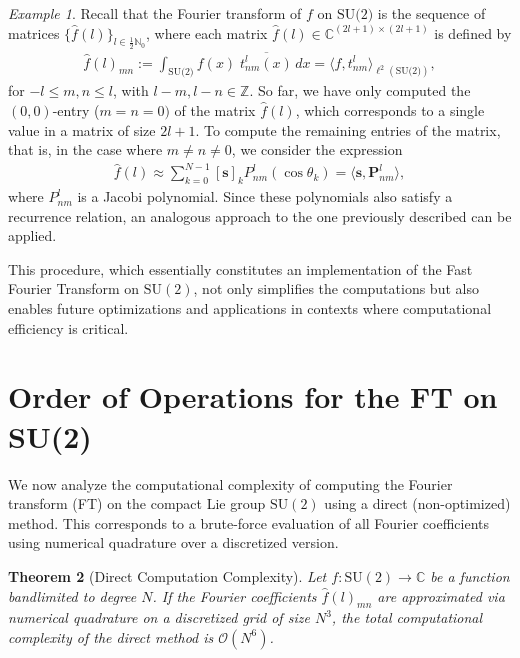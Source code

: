 \documentclass[11pt]{article}
\newtheorem{thm}{Theorem}[section]
\theoremstyle{definition}
\theoremstyle{remark}
\newtheorem{ex}[thm]{Example}
\numberwithin{equation}{section}
\begin{document}
\begin{ex}
Recall that the Fourier transform of $f$ on $\text{SU(2)}$ is the sequence of matrices $\{ \hat{f}(l) \}_{l \in \frac{1}{2} \mathbb{N}_0}$, where each matrix $\hat{f}(l) \in \mathbb{C}^{(2l+1) \times (2l+1)}$ is defined by
\begin{align*}
    \hat{f}(l)_{mn} := \int_{\text{SU(2)}} f(x) \; \overline{t^l_{nm}(x)} \, dx = \langle f, t^l_{nm} \rangle_{\ell^2(\text{SU(2)})},
\end{align*}
for $-l \leq m, n \leq l$, with $l - m, l - n \in \mathbb{Z}$.
So far, we have only computed the $(0, 0)$-entry ($m=n=0)$ of the matrix $\hat{f}(l)$, which corresponds to a single value in a matrix of size $2l+1$. To compute the remaining entries of the matrix, that is, in the case where $m \ne n \ne 0$, we consider the expression
\begin{align*}
    \hat{f}(l) \approx \sum_{k=0}^{N - 1} [\mathbf{s}]_k P^l_{nm}(\cos\theta_k) = \langle \mathbf{s}, \mathbf{P}^l_{nm} \rangle,
\end{align*}
where $P^l_{nm}$ is a Jacobi polynomial. Since these polynomials also satisfy a recurrence relation, an analogous approach to the one previously described can be applied.
\end{ex}
This procedure, which essentially constitutes an implementation of the Fast Fourier Transform on $\text{SU}(2)$, not only simplifies the computations but also enables future optimizations and applications in contexts where computational efficiency is critical.

\section{Order of Operations for the FT on SU(2)}\label{sec:order-FT}

We now analyze the computational complexity of computing the Fourier transform (FT) on the compact Lie group $\mathrm{SU}(2)$ using a direct (non-optimized) method. This corresponds to a brute-force evaluation of all Fourier coefficients using numerical quadrature over a discretized version.


\begin{thm}[Direct Computation Complexity]
Let $f : \mathrm{SU}(2) \to \mathbb{C}$ be a function bandlimited to degree $N$. If the Fourier coefficients $\hat{f}(l)_{mn}$ are approximated via numerical quadrature on a discretized grid of size $N^3$, the total computational complexity of the direct method is $\mathcal{O}(N^6)$.
\end{thm}
\end{document}
